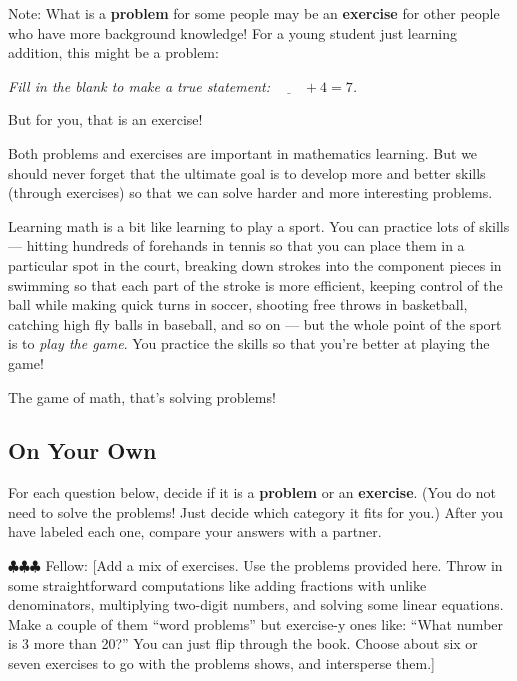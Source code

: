 \documentclass[10pt, reqno]{amsart}
\theoremstyle{remark}
\theoremstyle{definition}
\numberwithin{equation}{section}  %
\newcommand{\fellow}[1]{{\color{magenta} \sf $\clubsuit\clubsuit\clubsuit$ Fellow: [#1]}}
\begin{document}
Note: What is a {\bf problem} for some people may be an {\bf exercise} for other people who have more background knowledge!  For a young student just learning addition, this might be a problem:  
\begin{center}
\emph{Fill in the blank to make a true statement: $\underline{\qquad} + 4 = 7$. }
\end{center}
But for you, that is an exercise!

Both problems and exercises are important in mathematics learning.  But we should never forget that the ultimate goal is to develop more and better skills (through exercises) so that we can solve harder and more interesting problems.  

Learning math is a bit like learning to play a sport.  You can practice lots of skills --- hitting hundreds of forehands in tennis so that you can place them in a particular spot in the court, breaking down strokes into the component pieces in swimming so that each part of the stroke is more efficient, keeping control of the ball while making quick turns in soccer, shooting free throws in basketball, catching high fly balls in baseball, and so on --- but the whole point of the sport is to \emph{play the game}.  You practice the skills so that you're better at playing the game!

The game of math, that's solving problems!

\subsection*{On Your Own}
For each question below, decide if it is a {\bf problem} or an {\bf exercise}.   (You do not need to solve the problems!  Just decide which category it fits for you.)  After you have labeled each one, compare your answers with a partner.

\fellow{Add a mix of exercises.  Use the problems provided here.  Throw in some straightforward computations like adding fractions with unlike denominators, multiplying two-digit numbers, and solving some linear equations.  Make a couple of them ``word problems'' but exercise-y ones like: ``What number is 3 more than 20?''  You can just flip through the book.  Choose about six or seven exercises to go with the problems shows, and intersperse them.}
\end{document}
